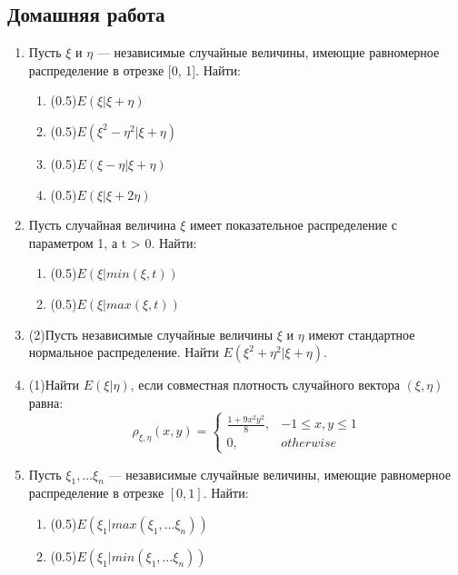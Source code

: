 \documentclass[a4paper, 14pt]{extarticle}
\begin{document}
\subsection*{Домашняя работа}
\begin{enumerate}
\item Пусть $\xi$ и $\eta$ — независимые случайные величины, имеющие
равномерное распределение в отрезке [0, 1]. Найти:
\begin{enumerate}
\item (0.5)$E(\xi|\xi + \eta)$
\item (0.5)$E(\xi^2 - \eta^2 |\xi + \eta)$
\item (0.5)$E(\xi - \eta|\xi + \eta)$
\item (0.5)$E(\xi|\xi + 2\eta)$
\end{enumerate}

\item Пусть случайная величина $\xi$ имеет показательное распределение 
с параметром 1, а t > 0. Найти:
\begin{enumerate}
\item (0.5)$E(\xi| min(\xi, t))$
\item (0.5)$E(\xi| max(\xi, t))$
\end{enumerate}
\item (2)Пусть независимые случайные величины $\xi$ и $\eta$ имеют стандартное
 нормальное распределение. Найти $E(\xi^2 + \eta^2 |\xi + \eta)$.
\item (1)Найти $E(\xi|\eta)$, если совместная плотность случайного вектора
$(\xi, \eta)$ равна:
	$$\rho_{\xi,\eta}(x,y) =\left\{
	\begin{array}{cc}
	\frac{1+9x^2y^2}{8}, & -1\leq x,y\leq 1\\
	0, & otherwise
	\end{array}\right.$$

\item Пусть $\xi_1, \ldots \xi_n$ — независимые случайные величины, имеющие
 равномерное распределение в отрезке $[0, 1]$. Найти:
\begin{enumerate}
\item (0.5)$E(\xi_1 | max(\xi_1, \ldots \xi_n))$
\item (0.5)$E(\xi_1 | min(\xi_1, \ldots \xi_n))$
\end{enumerate}

\end{enumerate}	
\end{document}
